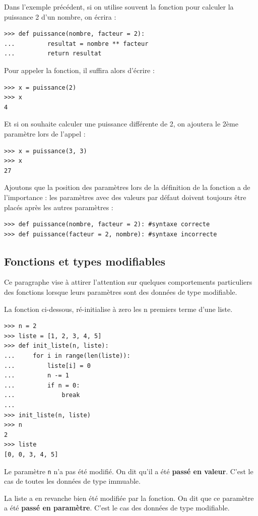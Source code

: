 \documentclass[12pt, a4paper]{article}
\begin{document}
Dans l'exemple précédent, si on utilise souvent la fonction pour calculer la puissance 2 d'un nombre, on écrira :
\begin{lstlisting}
>>> def puissance(nombre, facteur = 2):
...			resultat = nombre ** facteur
... 		return resultat
\end{lstlisting}

Pour appeler la fonction, il suffira alors d'écrire :
\begin{lstlisting}
>>> x = puissance(2)
>>> x
4
\end{lstlisting}

Et si on souhaite calculer une puissance différente de 2, on ajoutera le 2ème paramètre lors de l'appel :
\begin{lstlisting}
>>> x = puissance(3, 3)
>>> x
27
\end{lstlisting}

Ajoutons que la position des paramètres lors de la définition de la fonction a de l'importance : les paramètres avec des valeurs par défaut doivent toujours être placés après les autres paramètres :
\begin{lstlisting}
>>> def puissance(nombre, facteur = 2):	#syntaxe correcte
>>> def puissance(facteur = 2, nombre):	#syntaxe incorrecte
\end{lstlisting}


\subsection{Fonctions et types modifiables}
Ce paragraphe vise à attirer l'attention sur quelques comportements particuliers des fonctions lorsque leurs paramètres sont des données de type modifiable.

La fonction ci-dessous, ré-initialise à zero les n premiers terme d'une liste.
\begin{lstlisting}
>>> n = 2
>>> liste = [1, 2, 3, 4, 5]
>>> def init_liste(n, liste):
...	    for i in range(len(liste)):
...	        liste[i] = 0
...         n -= 1
...         if n = 0:
...             break
...
>>> init_liste(n, liste)
>>> n
2
>>> liste
[0, 0, 3, 4, 5]
\end{lstlisting}

Le paramètre \lstinline{n} n'a pas été modifié. On dit qu'il a été \textbf{passé en valeur}. C'est le cas de toutes les données de type immuable.

La liste a en revanche bien été modifiée par la fonction. On dit que ce paramètre a été \textbf{passé en paramètre}. C'est le cas des données de type modifiable.
\end{document}
